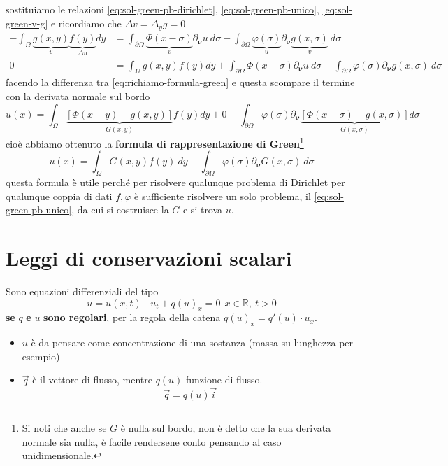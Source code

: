 \documentclass[10pt,a4paper,twoside,openright]{book}
\begin{document}
sostituiamo le relazioni \eqref{eq:sol-green-pb-dirichlet}, \eqref{eq:sol-green-pb-unico}, \eqref{eq:sol-green-v-g} e ricordiamo che $\Delta v=\Delta _{y} g=0$
\begin{align*}
	-\int _{\Omega } \underbrace{g( x,y)}_{v} \underbrace{f( y)}_{\Delta u} dy & =\int _{\partial \Omega } \underbrace{\Phi ( x-\sigma )}_{v} \partial _{\bm{\nu}} u\ d\sigma -\int _{\partial \Omega } \underbrace{\varphi ( \sigma )}_{u} \partial _{\bm{\nu}} \underbrace{g( x,\sigma )}_{v} \ d\sigma                                  \\
	0                                 & =\int _{\Omega } g( x,y) f( y) dy+\int _{\partial \Omega } \Phi ( x-\sigma ) \partial _{\bm{\nu}} u\ d\sigma -\int _{\partial \Omega } \varphi ( \sigma ) \partial _{\bm{\nu}} g( x,\sigma ) \ d\sigma 
\end{align*}
facendo la differenza tra \eqref{eq:richiamo-formula-green} e questa scompare il termine con la derivata normale sul bordo
\begin{equation*}
	u( x) =\int _{\Omega }\underbrace{[ \Phi ( x-y) -g( x,y)]}_{G( x,y)} f( y) dy+0-\int _{\partial \Omega } \varphi ( \sigma ) \partial_{\bm{\nu}}\underbrace{[ \Phi ( x-\sigma) -g( x,\sigma)]}_{G( x,\sigma)} d\sigma 
\end{equation*}
cioè abbiamo ottenuto la \textbf{formula di rappresentazione di Green}\footnote{Si noti che anche se $G$ è nulla sul bordo, non è detto che la sua derivata normale sia nulla, è facile rendersene conto pensando al caso unidimensionale.}
\begin{equation*}
	\boxed{u( x) =\int _{\Omega } G( x,y) f( y) \ dy-\int _{\partial \Omega } \varphi ( \sigma ) \partial_{\bm{\nu}} G( x,\sigma) \ d\sigma }
\end{equation*}
questa formula è utile perché per risolvere qualunque problema di Dirichlet per qualunque coppia di dati $f,\varphi $ è sufficiente risolvere un solo problema, il \eqref{eq:sol-green-pb-unico}, da cui si costruisce la $G$ e si trova $u$.
\chapter{Leggi di conservazioni scalari}

Sono equazioni differenziali del tipo
\begin{equation}
	u=u( x,t) \ \ \ \ \boxed{u_{t} +q( u)_{x} =0}\ \ x\in \mathbb{R} ,\ t >0
\end{equation}
\textbf{se }$q$\textbf{ e }$u$\textbf{ sono regolari}, per la regola della catena $q( u)_{x} =q'( u) \cdotp u_{x}$.
\begin{itemize}
	\item $u$ è da pensare come concentrazione di una sostanza (massa su lunghezza per esempio)
	\item $\vec{q}$ è il vettore di flusso, mentre $q( u)$ funzione di flusso.
	      \begin{equation}
	      	\vec{q} =q( u)\vec{i}
	      \end{equation}
\end{itemize}
\end{document}
